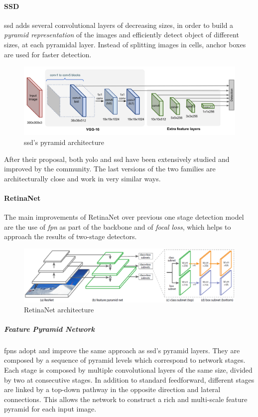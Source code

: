 \documentclass[%
    corpo=12pt,
    twoside,
    stile=classica,   
    tipotesi=magistrale,
    evenboxes,
    english,
	numerazioneromana,
]{toptesi}
\begin{document}
\paragraph{SSD}
\acrfull{ssd}\cite{Liu_2016} adds several convolutional layers of decreasing sizes, in order to build a \textit{pyramid representation} of the images and efficiently detect object of different sizes, at each pyramidal layer. Instead of splitting images in cells, anchor boxes are used for faster detection.

\begin{figure}
	\centering
	\includegraphics[width=.7\linewidth]{imgs/SSD-architecture.png}
	\caption{\acrshort{ssd}'s pyramid architecture\cite{objdetpart4}}
	\label{fig:ssd}
\end{figure}

After their proposal, both \gls{yolo} and \gls{ssd} have been extensively studied and improved by the community. The last versions of the two families are architecturally close and work in very similar ways.

\paragraph{RetinaNet}
The main improvements of RetinaNet\cite{lin2018focal} over previous one stage detection model are the use of \textit{\acrfull{fpn}} as part of the backbone and of \textit{focal loss}, which helps to approach the results of two-stage detectors.

\begin{figure}[ht!]
	\centering
	\includegraphics[width=0.8\linewidth]{imgs/retinanet.png}
	\caption{RetinaNet architecture\cite{lin2018focal}}
	\label{fig:retinanet}
\end{figure}

\subparagraph{Feature Pyramid Network}
\glspl{fpn}\cite{lin2017feature} adopt and improve the same approach as \acrshort{ssd}'s pyramid layers. They are composed by a sequence of pyramid levels which correspond to network stages. Each stage is composed by multiple convolutional layers of the same size, divided by two at consecutive stages. In addition to standard feedforward, different stages are linked by a top-down pathway in the opposite direction and lateral connections. This allows the network to construct a rich and multi-scale feature pyramid for each input image.
\end{document}
